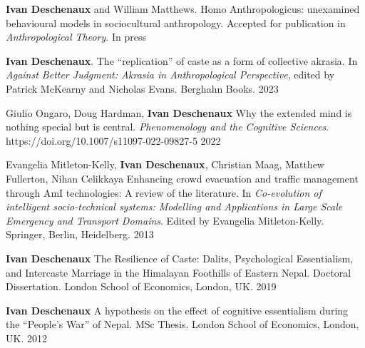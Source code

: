 \begin{cvpublications}

  \cvpublication
  {\textbf{Ivan Deschenaux} and William Matthews.}
  {Homo Anthropologicus: unexamined behavioural models in sociocultural anthropology. Accepted for publication in \textit{Anthropological Theory}.} %
  {In press} %

  \cvpublication
  {\textbf{Ivan Deschenaux}.}
  {The ``replication'' of caste as a form of collective akrasia. In \textit{Against Better Judgment: Akrasia in Anthropological Perspective}, edited by Patrick McKearny and Nicholas Evans. Berghahn Books.} %
  {2023} %


  \cvpublication
  {Giulio Ongaro, Doug Hardman, \textbf{Ivan Deschenaux}}
  {Why the extended mind is nothing special but is central. \textit{Phenomenology and the Cognitive Sciences}. https://doi.org/10.1007/s11097-022-09827-5} %
  {2022} %

  \cvpublication
  {Evangelia Mitleton-Kelly, \textbf{Ivan Deschenaux}, Christian Maag, Matthew Fullerton, Nihan Celikkaya}
  {Enhancing crowd evacuation and traffic management through AmI technologies: A review of the literature. In \textit{Co-evolution of intelligent socio-technical systems: Modelling and Applications in Large Scale Emergency and Transport Domains}. Edited by Evangelia Mitleton-Kelly. Springer, Berlin, Heidelberg.} %
  {2013} %

\end{cvpublications}



\begin{cvpublications}

  \cvpublication
  {\textbf{Ivan Deschenaux}}
  {The Resilience of Caste: Dalits, Psychological Essentialism, and Intercaste Marriage in the Himalayan Foothills of Eastern Nepal. Doctoral Dissertation. London School of Economics, London, UK.} %
  {2019} %

  \cvpublication
  {\textbf{Ivan Deschenaux}}
  {A hypothesis on the effect of cognitive essentialism during the ``People's War'' of Nepal. MSc Thesis. London School of Economics, London, UK.} %
  {2012} %

\end{cvpublications}
